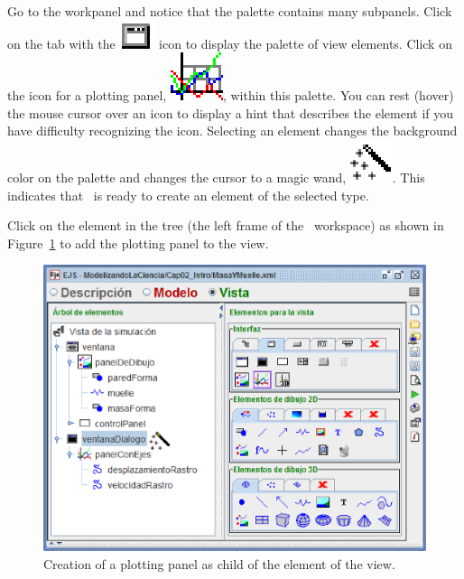 Go to the  workpanel and notice that the  palette contains many subpanels.  Click on the tab with the \includegraphics[scale=\linescale]{images/Groups/Containers.eps} icon to display the  palette of view elements.  Click on the icon for a plotting panel, \includegraphics[scale=\linescale]{images/Elements/PlottingPanel.eps}, within this palette. You can rest (hover) the mouse cursor over an icon to display a hint that describes the element if you have difficulty recognizing the icon.  Selecting an element changes the background color on the palette and changes the cursor to a magic wand, \includegraphics[scale=\linescale]{images/create.eps}. This indicates that \ejs\ is ready to create an element of the selected type.

Click on the  element in the tree (the left frame of the \ejs\ workspace) as shown in Figure~\ref{fig:02EjsIntro/ModifyViewAddPlottingPanel} to add the plotting panel to the view.

\begin{figure}[htb]
    \centering
  \includegraphics[scale=\scale]{02EjsIntro/images/ModifyViewAddPlottingPanel.eps}
    \caption{Creation of a plotting panel as child of the  element of the view. }
    \label{fig:02EjsIntro/ModifyViewAddPlottingPanel}
\end{figure}

